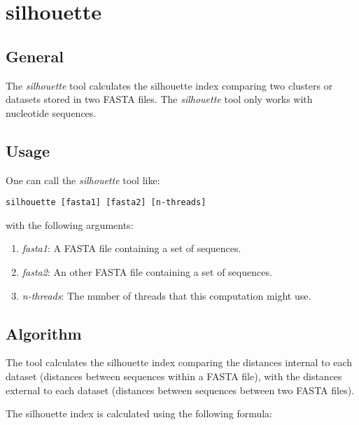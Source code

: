 \section{silhouette}

\subsection{General}

The \emph{silhouette} tool calculates the silhouette index comparing two
clusters or datasets stored in two FASTA files. The \emph{silhouette}
tool only works with nucleotide sequences.

\subsection{Usage}

One can call the \emph{silhouette} tool like:
\begin{lstlisting}
silhouette [fasta1] [fasta2] [n-threads]
\end{lstlisting}
with the following arguments:
\begin{enumerate}
\item \emph{fasta1}: A FASTA file containing a set of sequences.
\item \emph{fasta2}: An other FASTA file containing a set of sequences.
\item \emph{n-threads}: The number of threads that this computation might use.
\end{enumerate}

\subsection{Algorithm}

The tool calculates the silhouette index comparing the distances
internal to each dataset (distances between sequences within a FASTA
file), with the distances external to each dataset (distances between
sequences between two FASTA files).

The silhouette index is calculated using the following formula:

